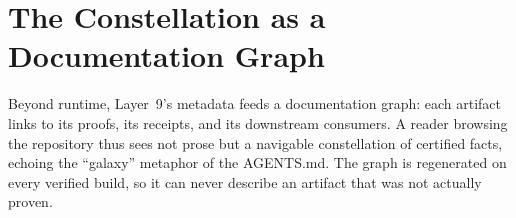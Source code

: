\section{The Constellation as a Documentation Graph}
\label{sec:const-docs}

Beyond runtime, Layer~9's metadata feeds a documentation graph: each
artifact links to its proofs, its receipts, and its downstream consumers.
A reader browsing the repository thus sees not prose but a navigable
constellation of certified facts, echoing the ``galaxy'' metaphor of the
AGENTS.md. The graph is regenerated on every verified build, so it can
never describe an artifact that was not actually proven.
